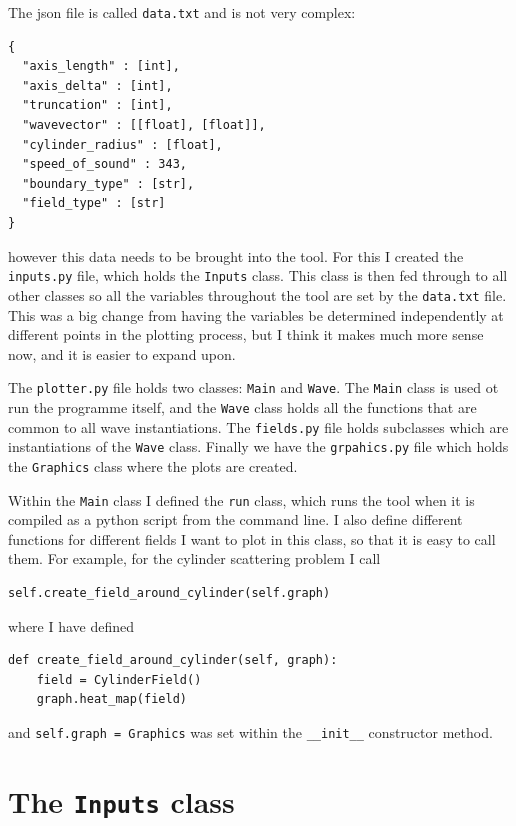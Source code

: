 The json file is called \verb!data.txt! and is not very complex:
\begin{lstlisting}
{
  "axis_length" : [int],
  "axis_delta" : [int],
  "truncation" : [int],
  "wavevector" : [[float], [float]],
  "cylinder_radius" : [float],
  "speed_of_sound" : 343,
  "boundary_type" : [str],
  "field_type" : [str]
} \end{lstlisting}
however this data needs to be brought into the tool. For this I created the \verb!inputs.py! file, which holds the \verb!Inputs! class. This class is then fed through to all other classes so all the variables throughout the tool are set by the \verb!data.txt! file. This was a big change from having the variables be determined independently at different points in the plotting process, but I think it makes much more sense now, and it is easier to expand upon.

The \verb!plotter.py! file holds two classes: \verb!Main! and \verb!Wave!. The \verb!Main! class is used ot run the programme itself, and the \verb!Wave! class holds all the functions that are common to all wave instantiations. The \verb!fields.py! file holds subclasses which are instantiations of the \verb!Wave! class. Finally we have the \verb!grpahics.py! file which holds the \verb!Graphics! class where the plots are created.

Within the \verb!Main! class I defined the \verb!run! class, which runs the tool when it is compiled as a python script from the command line. I also define different functions for different fields I want to plot in this class, so that it is easy to call them. For example, for the cylinder scattering problem I call
%
  \begin{lstlisting}
self.create_field_around_cylinder(self.graph) \end{lstlisting}
%
where I have defined
%
  \begin{lstlisting}
def create_field_around_cylinder(self, graph):
    field = CylinderField()
    graph.heat_map(field) \end{lstlisting}
%
and \verb!self.graph = Graphics! was set within the \verb!__init__! constructor method.



\section{The \texttt{Inputs} class}

